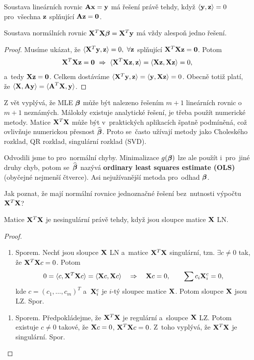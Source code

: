 \begin{lemma}
	Soustava lineárních rovnic $\textbf{A}\mathbf{x} = \mathbf{y}$ má řešení právě tehdy, když $\langle \mathbf{y},\mathbf{z}\rangle = 0$ pro~všechna $\mathbf{z}$ splňující $\textbf{A}\mathbf{z} = \boldsymbol{0}$.
\end{lemma}
\begin{theorem}
	Soustava normálních rovnic $\mathbf{X}^T\mathbf{X}\boldsymbol{\beta} = \mathbf{X}^T\mathbf{y}$ má vždy alespoň jedno řešení.
	\begin{proof}
		Musíme ukázat, že $\langle \mathbf{X}^T\mathbf{y},\mathbf{z}\rangle = 0,~\forall\mathbf{z}$ splňující $\mathbf{X}^T\mathbf{X}\mathbf{z} = \boldsymbol{0}$. Potom
		 $$\mathbf{X}^T\mathbf{X}\mathbf{z} = \boldsymbol{0}~\Rightarrow~\langle \mathbf{X}^T\mathbf{X}\mathbf{z},\mathbf{z}\rangle = \langle \mathbf{X}\mathbf{z},\mathbf{X}\mathbf{z}\rangle = 0,$$ a~tedy $\mathbf{X}\mathbf{z} = \boldsymbol{0}$. Celkem dostáváme $\langle\mathbf{X}^T\mathbf{y},\mathbf{z}\rangle = \langle\mathbf{y},\mathbf{X}\mathbf{z}\rangle = 0$. Obecně totiž platí, že $\langle \mathbf{X},\textbf{A}\mathbf{y}\rangle = \langle \textbf{A}^T\mathbf{X},\mathbf{y}\rangle$.
	\end{proof}
\end{theorem}
\begin{remark}
	Z vět vyplývá, že MLE $\boldsymbol{\beta}$ může být nalezeno řešením $m+1$ lineárních rovnic o~$m+1$ neznámých. Málokdy existuje analytické řešení, je třeba použít numerické metody. Matice $\mathbf{X}^T\mathbf{X}$ může být v~praktických aplikacích špatně podmíněná, což ovlivňuje numerickou přesnost $\widehat{\boldsymbol{\beta}}$. Proto se~často užívají metody jako Choleského rozklad, QR rozklad, singulární rozklad (SVD).
	
	Odvodili jsme to pro~normální chyby. Minimalizace $g(\boldsymbol{\beta})$ lze ale použít i~pro~jiné druhy chyb, potom se~$\widehat{\boldsymbol{\beta}}$ nazývá \textbf{ordinary least squares estimate (OLS)} (obyčejné nejmenší čtverce). Asi nejužívanější metoda  pro~odhad $\boldsymbol{\beta}$.
	
	Jak poznat, že mají normální rovnice jednoznačné řešení bez~nutnosti výpočtu $\mathbf{X}^T\mathbf{X}$?
\end{remark}
\begin{theorem}
	Matice $\mathbf{X}^T\mathbf{X}$ je nesingulární právě tehdy, když jsou sloupce matice $\mathbf{X}$ LN.
	\begin{proof}
		\begin{enumerate}[$\Leftarrow$]
			\item Sporem. Nechť jsou sloupce $\mathbf{X}$ LN a~matice $\mathbf{X}^T\mathbf{X}$ singulární, tzn. $\exists c\neq0$ tak, že $\mathbf{X}^T\mathbf{X} c = 0$. Potom
			 $$ 0 = \langle c,\mathbf{X}^T\mathbf{X} c\rangle = \langle \mathbf{X} c,\mathbf{X} c\rangle\quad \Rightarrow\quad\mathbf{X} c = 0,\qquad\sum c_i\mathbf{X}_i^c = 0, $$
			kde $c = (c_1,\dots,c_m)^T$ a~$\mathbf{X}_i^c$ je $i$-tý sloupec matice $\mathbf{X}$. Potom sloupce $\mathbf{X}$ jsou LZ. Spor.
		\end{enumerate}
	\begin{enumerate}[$\Rightarrow$]
	\item Sporem. Předpokládejme, že $\mathbf{X}^T\mathbf{X}$ je regulární a~sloupce $\mathbf{X}$ LZ. Potom existuje $c\neq0$ takové, že $\mathbf{X} c = 0$, $\mathbf{X}^T\mathbf{X} c = 0$. Z~toho vyplývá, že $\mathbf{X}^T\mathbf{X}$ je singulární. Spor.
\end{enumerate}
	\end{proof}
\end{theorem}
